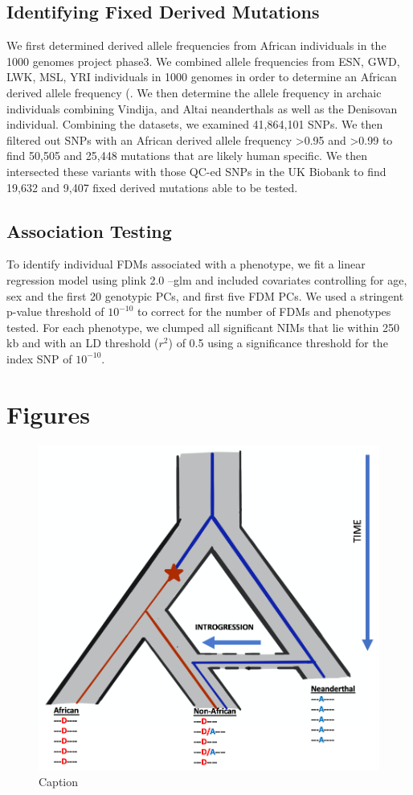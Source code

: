 \subsection{Identifying Fixed Derived Mutations}
 We first determined derived allele frequencies from African individuals in the 1000 genomes project phase3. We combined allele frequencies from ESN, GWD, LWK, MSL, YRI individuals in 1000 genomes in order to determine an African derived allele frequency (. We then determine the allele frequency in archaic individuals combining Vindija, and Altai neanderthals as well as the Denisovan individual. Combining the datasets, we examined 41,864,101 SNPs. We then filtered out SNPs with an African derived allele frequency >0.95 and >0.99 to find 50,505 and 25,448 mutations that are likely human specific. We then intersected these variants with those QC-ed SNPs in the UK Biobank to find 19,632 and 9,407 fixed derived mutations able to be tested.
\subsection{Association Testing}
To identify individual FDMs associated with a phenotype, we fit a linear regression model using plink 2.0 --glm and included covariates controlling for age, sex and the first 20 genotypic PCs, and first five FDM PCs. We used a stringent p-value threshold of $10^{-10}$ to correct for the number of FDMs and phenotypes tested. For each phenotype, we clumped all significant NIMs that lie within 250 kb and with an LD threshold ($r^2$) of 0.5 using a significance threshold for the index SNP of $10^{-10}$.
\newpage
\FloatBarrier
\section{Figures}
\begin{figure}[htb]
    \centering
    \includegraphics[width=\textwidth]{chapter4/figures/fig4.1.png}
    \caption{Caption}
    \label{fig:4.1}
\end{figure}

